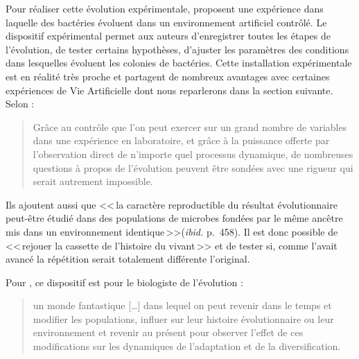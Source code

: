 Pour réaliser cette évolution expérimentale, \cite{lenski94dynamicsadaptationdiversification10000generationexperimentbacterialpopulations} proposent une expérience dans laquelle des bactéries évoluent dans un environnement artificiel contrôlé. Le dispositif expérimental permet aux auteurs d'enregistrer toutes les étapes de l'évolution, de tester certains hypothèses, d'ajuster les paramètres des conditions dans lesquelles évoluent les colonies de bactéries. Cette installation expérimentale est en réalité très proche et partagent de nombreux avantages avec certaines expériences de Vie Artificielle dont nous reparlerons dans la section suivante. Selon \citet[p. 457]{elena03evolutionexperimentsmicroorganismsdynamicsgeneticbasesadaptation} :
\begin{quote}
	Grâce au contrôle que l'on peut exercer sur un grand nombre de variables dans une expérience en laboratoire, et grâce à la puissance offerte par l'observation direct de n'importe quel processus dynamique, de nombreuses questions à propos de l'évolution peuvent être sondées avec une rigueur qui serait autrement impossible.
\end{quote}
Ils ajoutent aussi que <<\,la caractère reproductible du résultat évolutionnaire peut-être étudié dans des populations de microbes fondées par le même ancêtre mis dans un environnement identique\,>>(\emph{ibid.} p.~458). Il est donc possible de <<\,rejouer la cassette de l'histoire du vivant\,>> et de tester si, comme l'avait avancé \cite{gould1989wonderfullife} la répétition serait totalement différente l'original. 

Pour \cite{lenski94dynamicsadaptationdiversification10000generationexperimentbacterialpopulations}, ce dispositif est pour le biologiste de l'évolution : 
\begin{quote}
	un monde fantastique [\ldots] dans lequel on peut revenir dans le temps et modifier les populations, influer sur leur histoire évolutionnaire ou leur environnement et revenir au présent pour observer l'effet de ces modifications sur les dynamiques de l'adaptation et de la diversification.
\end{quote}

